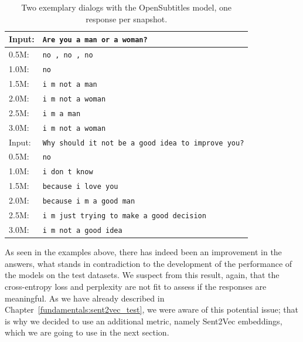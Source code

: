 \begin{table}[H]
	\centering
	\begin{adjustbox}{max width=\textwidth}
		\begin{tabular}{ll}
			\toprule
			Input: 	& \texttt{Are you a man or a woman?}\\
			\midrule
			0.5M: 	& \texttt{no , no , no}\\
			1.0M: 	& \texttt{no}\\
			1.5M:	& \texttt{i m not a man}\\
			2.0M:	& \texttt{i m not a woman}\\
			2.5M:	& \texttt{i m a man}\\
			3.0M:	& \texttt{i m not a woman}\\
			\midrule
			Input: 	& \texttt{Why should it not be a good idea to improve you?}\\
			\midrule
			0.5M: 	& \texttt{no}\\
			1.0M: 	& \texttt{i don t know}\\
			1.5M:	& \texttt{because i love you}\\
			2.0M:	& \texttt{because i m a good man}\\
			2.5M:	& \texttt{i m just trying to make a good decision}\\
			3.0M:	& \texttt{i m not a good idea}\\
			\bottomrule
		\end{tabular}
	\end{adjustbox}
	\caption{Two exemplary dialogs with the OpenSubtitles model, one response per snapshot.}
	\label{results:example_output:opensubtitles}
\end{table}

As seen in the examples above, there has indeed been an improvement in the answers, what stands in contradiction to the development of the performance of the models on the test datasets. We suspect from this result, again, that the cross-entropy loss and perplexity are not fit to assess if the responses are meaningful. As we have already described in Chapter~\ref{fundamentals:sent2vec_test}, we were aware of this potential issue; that is why we decided to use an additional metric, namely Sent2Vec embeddings, which we are going to use in the next section.

